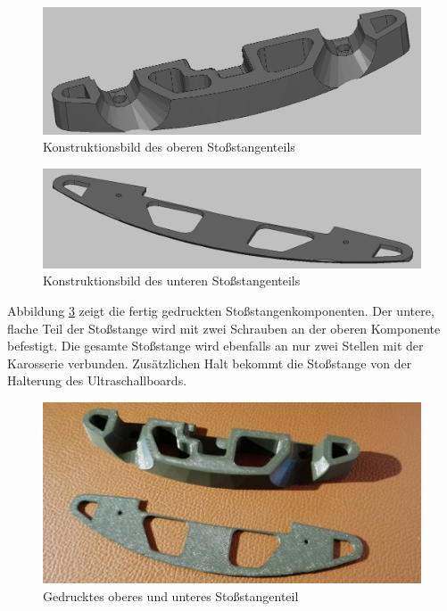 \begin{figure}[H] %
\includegraphics[width=.8\textwidth]{sec2/images/3DAnbaukomponenten/Konstruktionsbilder/StossstangeKonstruktion01} 
\centering
\captionsetup{width=.95\textwidth}
\caption[Konstruktionsbild des oberen Stoßstangenteils]{Konstruktionsbild des oberen Stoßstangenteils}\centering
\label{fig:StossstangeKonstruktion01}
\end{figure}

\begin{figure}[H] %
\includegraphics[width=.8\textwidth]{sec2/images/3DAnbaukomponenten/Konstruktionsbilder/StossstangeKonstruktion02} 
\centering
\captionsetup{width=.95\textwidth}
\caption[Konstruktionsbild des unteren Stoßstangenteils]{Konstruktionsbild des unteren Stoßstangenteils}\centering
\label{fig:StossstangeKonstruktion02}
\end{figure}

Abbildung \ref{fig:StossstangeDruck} zeigt die fertig gedruckten Stoßstangenkomponenten. Der untere, flache Teil der Stoßstange wird mit zwei Schrauben an der oberen Komponente befestigt. Die gesamte Stoßstange wird ebenfalls an nur zwei Stellen mit der Karosserie verbunden. Zusätzlichen Halt bekommt die Stoßstange von der Halterung des Ultraschallboards.

\begin{figure}[H] %
\includegraphics[width=.7\textwidth]{sec2/images/3DAnbaukomponenten/Druckbilder/StossstangeDruck} 
\centering
\captionsetup{width=.95\textwidth}
\caption[Gedrucktes oberes und unteres Stoßstangenteil]{Gedrucktes oberes und unteres Stoßstangenteil}\centering
\label{fig:StossstangeDruck}
\end{figure}


